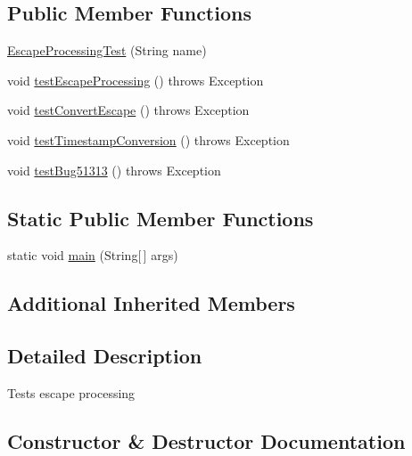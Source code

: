 \subsection*{Public Member Functions}
\begin{DoxyCompactItemize}
\item 
\mbox{\hyperlink{classtestsuite_1_1simple_1_1_escape_processing_test_a81d83c09c29ce9529a293d56e6097efe}{Escape\+Processing\+Test}} (String name)
\item 
void \mbox{\hyperlink{classtestsuite_1_1simple_1_1_escape_processing_test_a89dd9212c87f06506d7442cafd9ce935}{test\+Escape\+Processing}} ()  throws Exception 
\item 
void \mbox{\hyperlink{classtestsuite_1_1simple_1_1_escape_processing_test_a72337dad91eb44391ac9f34d7531b177}{test\+Convert\+Escape}} ()  throws Exception 
\item 
void \mbox{\hyperlink{classtestsuite_1_1simple_1_1_escape_processing_test_aaf3f62a0f5fc6b6d808edba7f20361c3}{test\+Timestamp\+Conversion}} ()  throws Exception 
\item 
void \mbox{\hyperlink{classtestsuite_1_1simple_1_1_escape_processing_test_a06117e478b5255ff186b2a98f7b08b50}{test\+Bug51313}} ()  throws Exception 
\end{DoxyCompactItemize}
\subsection*{Static Public Member Functions}
\begin{DoxyCompactItemize}
\item 
static void \mbox{\hyperlink{classtestsuite_1_1simple_1_1_escape_processing_test_acf0bde8d1c2ad44b686c7200a26a80ff}{main}} (String\mbox{[}$\,$\mbox{]} args)
\end{DoxyCompactItemize}
\subsection*{Additional Inherited Members}


\subsection{Detailed Description}
Tests escape processing 

\subsection{Constructor \& Destructor Documentation}
\mbox{\label{classtestsuite_1_1simple_1_1_escape_processing_test_a81d83c09c29ce9529a293d56e6097efe}} 
